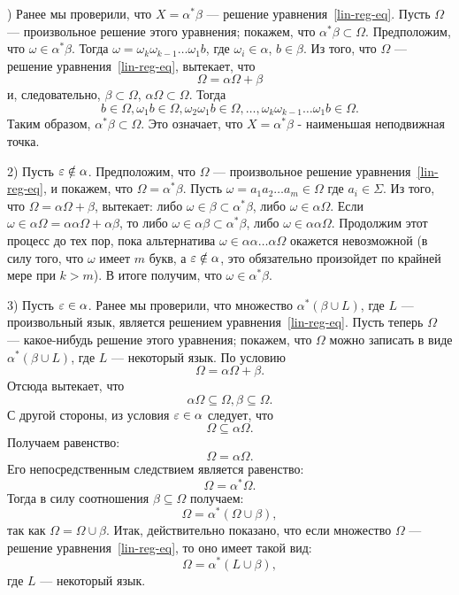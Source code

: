 \begin{myproof}
\hfill {}) Ранее мы проверили, что $X=\alpha^*\beta$ --- решение уравнения~\eqref{lin-reg-eq}. Пусть $\Omega$ --- произвольное решение этого уравнения; покажем, что $\alpha^*\beta\subset\Omega$. Предположим, что $\omega\in\alpha^*\beta$. Тогда $\omega=\omega_k\omega_{k-1}\ldots\omega_1b$, где $\omega_i\in\alpha$, $b\in\beta$. Из того, что $\Omega$ --- решение уравнения~\eqref{lin-reg-eq}, вытекает, что
\[
	\Omega = \alpha\Omega + \beta
\]
и, следовательно, $\beta\subset\Omega$, $\alpha\Omega\subset\Omega.$ Тогда
\[
b\in\Omega, \omega_1b\in\Omega, \omega_2\omega_1b\in\Omega, \ldots , \omega_k\omega_{k-1}\ldots\omega_1b\in\Omega.
\]
Таким образом, $\alpha^*\beta\subset\Omega$. Это означает, что $X=\alpha^*\beta$ - наименьшая неподвижная точка.

2)	Пусть $\varepsilon\notin\alpha$. Предположим, что $\Omega$ --- произвольное решение уравнения~\eqref{lin-reg-eq}, и покажем, что $\Omega=\alpha^*\beta$. Пусть $\omega=a_1a_2\ldots a_m\in\Omega$ где $a_i\in\Sigma$. Из того, что $\Omega=\alpha\Omega+\beta$, вытекает: либо $\omega\in\beta\subset\alpha^*\beta$, либо $\omega\in\alpha\Omega$. Если $\omega\in\alpha\Omega=\alpha\alpha\Omega+\alpha\beta$, то либо $\omega\in\alpha\beta\subset\alpha^*\beta$, либо $\omega\in\alpha\alpha\Omega$. Продолжим этот процесс до тех пор, пока альтернатива $\omega\in\alpha\alpha\ldots\alpha\Omega$ окажется невозможной (в силу того, что $\omega$ имеет $m$ букв, а $\varepsilon\notin\alpha$, это обязательно произойдет по крайней мере при $k>m$). В итоге получим, что $\omega\in\alpha^*\beta$.

3) Пусть $\varepsilon\in\alpha$. Ранее мы проверили, что множество $\alpha^*(\beta\cup L)$, где $L$ --- произвольный язык, является решением уравнения~\eqref{lin-reg-eq}. Пусть теперь $\Omega$ --- какое-нибудь решение этого уравнения; покажем, что $\Omega$ можно записать в виде $\alpha^*(\beta\cup L)$, где $L$ --- некоторый язык. По условию
\[
\Omega = \alpha\Omega + \beta.
\]
Отсюда вытекает, что
\[
\alpha\Omega \subseteq \Omega, \beta \subseteq \Omega.
\]
С другой стороны, из условия $\varepsilon\in\alpha$ следует, что
\[
\Omega \subseteq \alpha\Omega.
\]
Получаем равенство:
\[
\Omega = \alpha\Omega.
\]
Его непосредственным следствием является равенство:
\[
\Omega = \alpha^*\Omega.
\]
Тогда в силу соотношения $\beta\subseteq\Omega$ получаем:
\[
\Omega = \alpha^*(\Omega \cup \beta),
\]
так как $\Omega=\Omega\cup\beta$. Итак, действительно показано, что если множество $\Omega$ --- решение уравнения~\eqref{lin-reg-eq}, то оно имеет такой вид:
\[
\Omega = \alpha^*(L \cup \beta),
\]
где $L$ --- некоторый язык.
\end{myproof}

